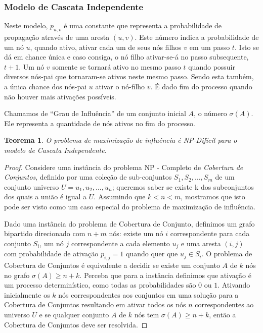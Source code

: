 \documentclass{acm_proc_article-sp}
\newtheorem{thm}{Teorema}
\begin{document}
  \subsubsection{Modelo de Cascata Independente}\label{icm}
Neste modelo, $p_{u,v}$ é uma constante que representa a probabilidade de propagação através de uma aresta $(u,v)$. Este número 
indica a probabilidade de um nó $u$, quando ativo, ativar cada um de seus nós filhos $v$ em um passo $t$. Isto se dá em chance 
única e caso consiga, o nó filho ativar-se-á no passo subsequente, $t+1$. Um nó $v$ somente se tornará ativo no mesmo passo $t$ quando 
possuir diversos nós-pai que tornaram-se ativos neste mesmo passo. Sendo esta também, a única chance dos nós-pai $u$ ativar o 
nó-filho $v$. É dado fim do processo quando não houver mais ativações possíveis.

Chamamos de ``Grau de Influência'' de um conjunto inicial $A$, o número $\sigma(A)$. Ele representa a quantidade de nós 
ativos no fim do processo.

\begin{thm}
O problema de maximização de influência é NP-Difícil para o modelo de Cascata Independente.
\end{thm}

\begin{proof}
Considere uma instância do problema NP - Completo de \textit{Cobertura de Conjuntos}, definido por uma coleção de
sub-conjuntos $S_{1}, S_{2},\ldots,S_{m}$ de um conjunto universo $U = {u_{1},u_{2},\ldots,u_{n}}$; queremos saber
se existe k dos subconjuntos dos quais a união é igual a $U$. Assumindo que $k < n < m$, mostramos que isto pode
ser visto como um caso especial do problema de maximização de influência.

Dado uma instância do problema de Cobertura de Conjunto, definimos um grafo bipartido direcionado com $n + m$ nós:
existe um nó $i$ correspondente para cada conjunto $S_{i}$, um nó $j$ correspondente a cada elemento $u_{j}$ e uma
aresta $(i,j)$ com probabilidade de ativação $p_{i,j} = 1$ quando quer que $u_{j} \in S_{i}$. O problema de
Cobertura de Conjuntos é equivalente a decidir se existe um conjunto $A$ de $k$ nós no grafo $\sigma(A) \geq
n + k$. Perceba que para a instância definimos que ativação é um processo determinístico, como todas as
probabilidades são $0$ ou $1$. Ativando inicialmente os $k$ nós correspondentes aos conjuntos em uma solução para a
Cobertura de Conjuntos resultando em ativar todos os nós $n$ correspondentes ao universo $U$ e se qualquer conjunto
$A$ de $k$ nós tem $\sigma(A) \geq n + k$, então a Cobertura de Conjuntos deve ser resolvida.
\end{proof}
\end{document}
